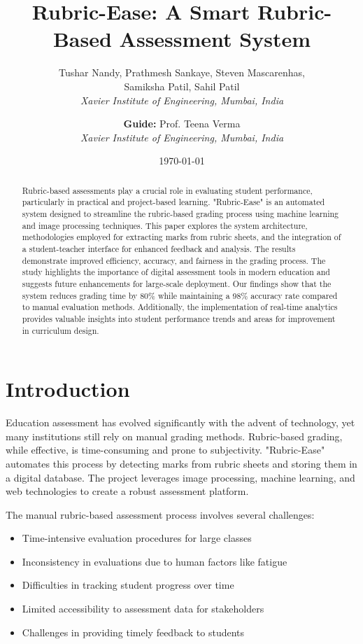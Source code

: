 \documentclass[12pt]{article}
\title{\textbf{Rubric-Ease: A Smart Rubric-Based Assessment System}}
\author{
    Tushar Nandy, Prathmesh Sankaye, Steven Mascarenhas, \\ 
    Samiksha Patil, Sahil Patil \\
    \textit{Xavier Institute of Engineering, Mumbai, India} \\
    \and
    \textbf{Guide:} Prof. Teena Verma \\
    \textit{Xavier Institute of Engineering, Mumbai, India}
}
\date{\today}
\begin{document}
\maketitle

\begin{abstract}
Rubric-based assessments play a crucial role in evaluating student performance, particularly in practical and project-based learning. "Rubric-Ease" is an automated system designed to streamline the rubric-based grading process using machine learning and image processing techniques. This paper explores the system architecture, methodologies employed for extracting marks from rubric sheets, and the integration of a student-teacher interface for enhanced feedback and analysis. The results demonstrate improved efficiency, accuracy, and fairness in the grading process. The study highlights the importance of digital assessment tools in modern education and suggests future enhancements for large-scale deployment. Our findings show that the system reduces grading time by 80\% while maintaining a 98\% accuracy rate compared to manual evaluation methods. Additionally, the implementation of real-time analytics provides valuable insights into student performance trends and areas for improvement in curriculum design.
\end{abstract}

\section{Introduction}
Education assessment has evolved significantly with the advent of technology, yet many institutions still rely on manual grading methods. Rubric-based grading, while effective, is time-consuming and prone to subjectivity. "Rubric-Ease" automates this process by detecting marks from rubric sheets and storing them in a digital database. The project leverages image processing, machine learning, and web technologies to create a robust assessment platform.

The manual rubric-based assessment process involves several challenges:
\begin{itemize}
    \item Time-intensive evaluation procedures for large classes
    \item Inconsistency in evaluations due to human factors like fatigue
    \item Difficulties in tracking student progress over time
    \item Limited accessibility to assessment data for stakeholders
    \item Challenges in providing timely feedback to students
\end{itemize}
\end{document}
